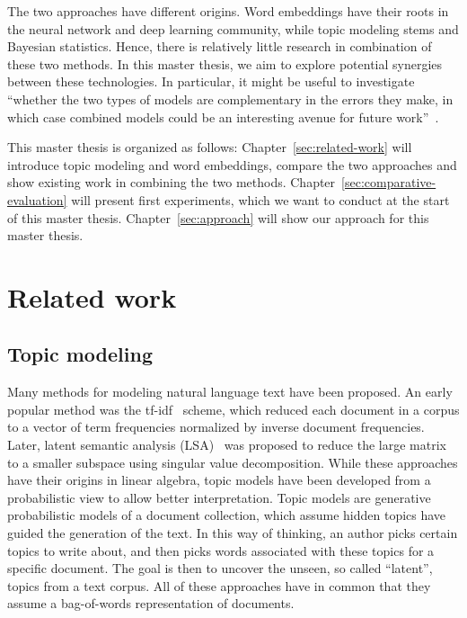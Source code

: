 \documentclass[
        a4paper,
        titlepage,
        twoside,
        parskip
        ]{scrbook}
\theoremstyle{break}
\begin{document}
The two approaches have different origins.
Word embeddings have their roots in the neural network and deep learning community, while topic modeling stems and Bayesian statistics.
Hence, there is relatively little research in combination of these two methods.
In this master thesis, we aim to explore potential synergies between these technologies.
In particular, it might be useful to investigate ``whether the two types of models are complementary in the errors they make, in which case combined models could be an interesting avenue for future work''~\cite{Baroni2014}.

This master thesis is organized as follows: Chapter~\ref{sec:related-work} will introduce topic modeling and word embeddings, compare the two approaches and show existing work in combining the two methods.
Chapter~\ref{sec:comparative-evaluation} will present first experiments, which we want to conduct at the start of this master thesis.
Chapter~\ref{sec:approach} will show our approach for this master thesis.

\chapter{Related work}
\label{chapter:related-work}
\section{Topic modeling}

Many methods for modeling natural language text have been proposed.
An early popular method was the tf-idf~\cite{SparckJones1972} scheme, which reduced each document in a corpus to a vector of term frequencies normalized by inverse document frequencies.
Later, latent semantic analysis (LSA)~\cite{Deerwester1990} was proposed to reduce the large matrix to a smaller subspace using singular value decomposition.
While these approaches have their origins in linear algebra, topic models have been developed from a probabilistic view to allow better interpretation.
Topic models are generative probabilistic models of a document collection, which assume hidden topics have guided the generation of the text.
In this way of thinking, an author picks certain topics to write about, and then picks words associated with these topics for a specific document.
The goal is then to uncover the unseen, so called ``latent'', topics from a text corpus.
All of these approaches have in common that they assume a bag-of-words representation of documents.
\end{document}
